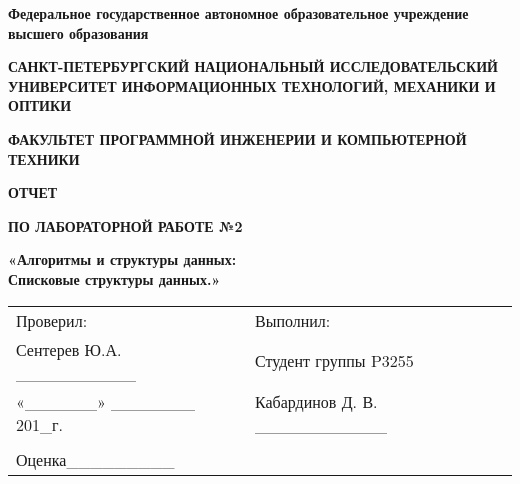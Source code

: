 \documentclass[12pt]{article}
\begin{document}
\setlength{\parindent}{0pt}
\pagestyle{empty}
\begin{center}
\normalsize
\textbf{Федеральное государственное автономное образовательное учреждение высшего образования}

\small
\medskip 
\textbf{САНКТ-ПЕТЕРБУРГСКИЙ НАЦИОНАЛЬНЫЙ ИССЛЕДОВАТЕЛЬСКИЙ  УНИВЕРСИТЕТ ИНФОРМАЦИОННЫХ ТЕХНОЛОГИЙ, МЕХАНИКИ И ОПТИКИ}

\medskip 
\textbf{ФАКУЛЬТЕТ ПРОГРАММНОЙ ИНЖЕНЕРИИ И КОМПЬЮТЕРНОЙ ТЕХНИКИ}
\end{center}
\bigskip\bigskip\bigskip\bigskip\bigskip\bigskip\bigskip\bigskip\bigskip\bigskip\bigskip\bigskip
\begin{center}
\par\medskip\par\smallskip
\Large
 
\par\smallskip
\textbf{ОТЧЕТ} 

\textbf{ПО ЛАБОРАТОРНОЙ РАБОТЕ №2}

\large
\par\bigskip
\textbf{«Алгоритмы и структуры данных: \\ Списковые структуры данных.»}
\par\bigskip\par\bigskip\par\bigskip\par\bigskip\par\bigskip\par\bigskip
\par\bigskip\par\bigskip\par\bigskip\par\bigskip\par\bigskip\par\bigskip
\par\bigskip\par\bigskip\par\bigskip\par\bigskip\par\bigskip\par\bigskip
\end{center}
\begin{center}
\begin{tabular}{lllll}
Проверил:	 	 						& \hspace{80pt}	&	Выполнил:										&\\
Сентерев Ю.А.	 \_\_\_\_\_\_\_\_\_\_	&			    &	Студент группы P3255							&\\
«\_\_\_\_\_\_» 	 \_\_\_\_\_\_\_ 201\_г.  & 				&	Кабардинов Д. В. \_\_\_\_\_\_\_\_\_\_\_			&\\
										&				&													&\\
Оценка\hspace{12pt}\_\_\_\_\_\_\_\_\_	&				&													&\\
\end{tabular}
\par\bigskip\par\bigskip\par\bigskip
                                                  
\par\bigskip \par\bigskip
\end{center}
\end{document}
